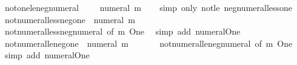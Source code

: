 \begin{isabellebody}
\endisatagproof
{\isafoldproof}%
%
\isadelimproof
\isanewline
%
\endisadelimproof
\isanewline
{}\isamarkupfalse%
\ not{\isacharunderscore}{\kern0pt}one{\isacharunderscore}{\kern0pt}le{\isacharunderscore}{\kern0pt}neg{\isacharunderscore}{\kern0pt}numeral{\isacharcolon}{\kern0pt}\ {\isachardoublequoteopen}{\isasymnot}\ {}\ {\isasymle}\ {\isacharminus}{\kern0pt}\ numeral\ m{\isachardoublequoteclose}\isanewline
%
\isadelimproof
\ \ %
\endisadelimproof
%
\isatagproof
{}\isamarkupfalse%
\ {\isacharparenleft}{\kern0pt}simp\ only{\isacharcolon}{\kern0pt}\ not{\isacharunderscore}{\kern0pt}le\ neg{\isacharunderscore}{\kern0pt}numeral{\isacharunderscore}{\kern0pt}less{\isacharunderscore}{\kern0pt}one{\isacharparenright}{\kern0pt}%
\endisatagproof
{\isafoldproof}%
%
\isadelimproof
\isanewline
%
\endisadelimproof
\isanewline
{}\isamarkupfalse%
\ not{\isacharunderscore}{\kern0pt}numeral{\isacharunderscore}{\kern0pt}less{\isacharunderscore}{\kern0pt}neg{\isacharunderscore}{\kern0pt}one{\isacharcolon}{\kern0pt}\ {\isachardoublequoteopen}{\isasymnot}\ numeral\ m\ {\isacharless}{\kern0pt}\ {\isacharminus}{\kern0pt}\ {}{\isachardoublequoteclose}\isanewline
%
\isadelimproof
\ \ %
\endisadelimproof
%
\isatagproof
{}\isamarkupfalse%
\ not{\isacharunderscore}{\kern0pt}numeral{\isacharunderscore}{\kern0pt}less{\isacharunderscore}{\kern0pt}neg{\isacharunderscore}{\kern0pt}numeral\ {\isacharbrackleft}{\kern0pt}of\ m\ One{\isacharbrackright}{\kern0pt}\ \isamarkupfalse%
\ {\isacharparenleft}{\kern0pt}simp\ add{\isacharcolon}{\kern0pt}\ numeral{\isacharunderscore}{\kern0pt}One{\isacharparenright}{\kern0pt}%
\endisatagproof
{\isafoldproof}%
%
\isadelimproof
\isanewline
%
\endisadelimproof
\isanewline
{}\isamarkupfalse%
\ not{\isacharunderscore}{\kern0pt}numeral{\isacharunderscore}{\kern0pt}le{\isacharunderscore}{\kern0pt}neg{\isacharunderscore}{\kern0pt}one{\isacharcolon}{\kern0pt}\ {\isachardoublequoteopen}{\isasymnot}\ numeral\ m\ {\isasymle}\ {\isacharminus}{\kern0pt}\ {}{\isachardoublequoteclose}\isanewline
%
\isadelimproof
\ \ %
\endisadelimproof
%
\isatagproof
{}\isamarkupfalse%
\ not{\isacharunderscore}{\kern0pt}numeral{\isacharunderscore}{\kern0pt}le{\isacharunderscore}{\kern0pt}neg{\isacharunderscore}{\kern0pt}numeral\ {\isacharbrackleft}{\kern0pt}of\ m\ One{\isacharbrackright}{\kern0pt}\ \isamarkupfalse%
\ {\isacharparenleft}{\kern0pt}simp\ add{\isacharcolon}{\kern0pt}\ numeral{\isacharunderscore}{\kern0pt}One{\isacharparenright}{\kern0pt}%

\end{isabellebody}
